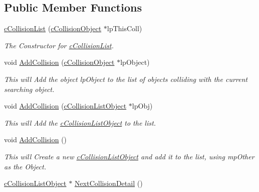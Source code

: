 \subsection*{Public Member Functions}
\begin{DoxyCompactItemize}
\item 
\hypertarget{classc_collision_list_a4adf1dbacad75c4cb5effee1fecd66c7}{
\hyperlink{classc_collision_list_a4adf1dbacad75c4cb5effee1fecd66c7}{cCollisionList} (\hyperlink{classc_collision_object}{cCollisionObject} $\ast$lpThisColl)}
\label{classc_collision_list_a4adf1dbacad75c4cb5effee1fecd66c7}

\begin{DoxyCompactList}\small\item\em The Constructor for \hyperlink{classc_collision_list}{cCollisionList}. \end{DoxyCompactList}\item 
\hypertarget{classc_collision_list_ace525d10fc1a38477cee11e14714b476}{
void \hyperlink{classc_collision_list_ace525d10fc1a38477cee11e14714b476}{AddCollision} (\hyperlink{classc_collision_object}{cCollisionObject} $\ast$lpObject)}
\label{classc_collision_list_ace525d10fc1a38477cee11e14714b476}

\begin{DoxyCompactList}\small\item\em This will Add the object lpObject to the list of objects colliding with the current searching object. \end{DoxyCompactList}\item 
\hypertarget{classc_collision_list_a6d9e443db874b3c4f8c4e6609be5bad5}{
void \hyperlink{classc_collision_list_a6d9e443db874b3c4f8c4e6609be5bad5}{AddCollision} (\hyperlink{classc_collision_list_object}{cCollisionListObject} $\ast$lpObj)}
\label{classc_collision_list_a6d9e443db874b3c4f8c4e6609be5bad5}

\begin{DoxyCompactList}\small\item\em This will Add the \hyperlink{classc_collision_list_object}{cCollisionListObject} to the list. \end{DoxyCompactList}\item 
\hypertarget{classc_collision_list_a9dc048e75aaaa2e92aa4af743345d8fd}{
void \hyperlink{classc_collision_list_a9dc048e75aaaa2e92aa4af743345d8fd}{AddCollision} ()}
\label{classc_collision_list_a9dc048e75aaaa2e92aa4af743345d8fd}

\begin{DoxyCompactList}\small\item\em This will Create a new \hyperlink{classc_collision_list_object}{cCollisionListObject} and add it to the list, using mpOther as the Object. \end{DoxyCompactList}\item 
\hypertarget{classc_collision_list_a88c7b96567c9fca6bcbf018e9439c641}{
\hyperlink{classc_collision_list_object}{cCollisionListObject} $\ast$ \hyperlink{classc_collision_list_a88c7b96567c9fca6bcbf018e9439c641}{NextCollisionDetail} ()}
\label{classc_collision_list_a88c7b96567c9fca6bcbf018e9439c641}


\end{DoxyCompactItemize}

